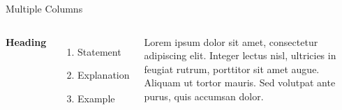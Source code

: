 \documentclass[aspectratio=169,xcolor=dvipsnames]{beamer}
\begin{document}
	
	\begin{frame}{Multiple Columns}
		\begin{columns}[c] %
			
			\textbf{Heading}
			\begin{enumerate}
				\item Statement
				\item Explanation
				\item Example
			\end{enumerate}
			
			Lorem ipsum dolor sit amet, consectetur adipiscing elit. Integer lectus nisl, ultricies in feugiat rutrum, porttitor sit amet augue. Aliquam ut tortor mauris. Sed volutpat ante purus, quis accumsan dolor.
			
		\end{columns}
	\end{frame}
	
\end{document}
